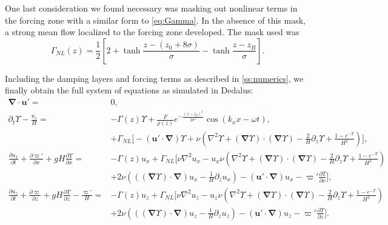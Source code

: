 \documentclass[
        fleqn,
        usenatbib,
    ]{mnras}
\newcommand*{\pd}[2]{\frac{\partial#1}{\partial#2}}
\newcommand*{\p}[1]{\left(#1\right)}
\newcommand*{\s}[1]{\left[#1\right]}
\newcommand*{\bm}[1]{\boldsymbol{\mathbf{#1}}}
\begin{document}
One last consideration we found necessary was masking out nonlinear terms in the
forcing zone with a similar form to \autoref{eq:Gamma}. In the absence of this
mask, a strong mean flow localized to the forcing zone developed. The mask used
was
\begin{equation}
    \Gamma_{NL}(z) = \frac{1}{2}\s{2
        + \tanh \frac{z - (z_0 + 8\sigma)}{\sigma}
        - \tanh \frac{z - z_B}{\sigma}}.
\end{equation}

Including the damping layers and forcing terms as described in
\autoref{ss:numerics}, we finally obtain the full system of equations as
simulated in Dedalus:
\begin{subequations}
    \begin{align}
        \bm{\nabla} \cdot \bm{u}' ={}& 0,\\
        \partial_t \Upsilon - \frac{u_z}{H}
            ={}& -\Gamma(z) \Upsilon
                + \frac{F}{\overline{\rho}(z)}e^{-\frac{(z - z_0)^2}{2\sigma^2}}
                    \cos \p{k_xx - \omega t},\nonumber\\
            & + \Gamma_{NL} \bigg[-\p{\bm{u}' \cdot \bm{\nabla}}\Upsilon
                + \nu\p{\nabla^2 \Upsilon + \p{
                    \bm{\nabla} \Upsilon} \cdot \p{\bm{\nabla}\Upsilon}
                    - \frac{2}{H}\partial_z \Upsilon
                    + \frac{1 - e^{-\Upsilon}}{H^2}}\bigg],\\
        \pd{u_x}{t} + \pd{\varpi'}{x} + gH\pd{\Upsilon}{x} ={}&
            -\Gamma(z) u_x
            + \Gamma_{NL}\bigg[\nu \nabla^2 u_x
            - u_x \nu\p{\nabla^2 \Upsilon + \p{\bm{\nabla} \Upsilon} \cdot
                \p{\bm{\nabla}\Upsilon} - \frac{2}{H}\partial_z \Upsilon
                + \frac{1 - e^{-\Upsilon}}{H^2}}\nonumber\\
            &+ 2\nu \p{\p{\p{\bm{\nabla}\Upsilon} \cdot \bm{\nabla}}u_x
                - \frac{1}{H}\partial_z u_x}
                - \p{\bm{u}' \cdot \bm{\nabla}}u_x
                - \varpi' \pd{\Upsilon}{x}\bigg],\\
        \pd{u_z}{t} + \pd{\varpi}{z} + gH\pd{\Upsilon}{z} - \frac{\varpi'}{H}
            ={}& -\Gamma(z) u_z
            +\Gamma_{NL}\bigg[\nu \nabla^2 u_z
            - u_z \nu\p{\nabla^2 \Upsilon + \p{\bm{\nabla} \Upsilon} \cdot
                \p{\bm{\nabla}\Upsilon} - \frac{2}{H}\partial_z \Upsilon
                + \frac{1 - e^{-\Upsilon}}{H^2}}\nonumber\\
            &+ 2\nu \p{\p{\p{\bm{\nabla}\Upsilon} \cdot \bm{\nabla}}u_z -
                \frac{1}{H}\partial_z u_{z}}
            - \p{\bm{u}' \cdot \bm{\nabla}}u_z
            - \varpi' \pd{\Upsilon}{z}\bigg].
    \end{align}
\end{subequations}
\label{lastpage} %
\end{document}
